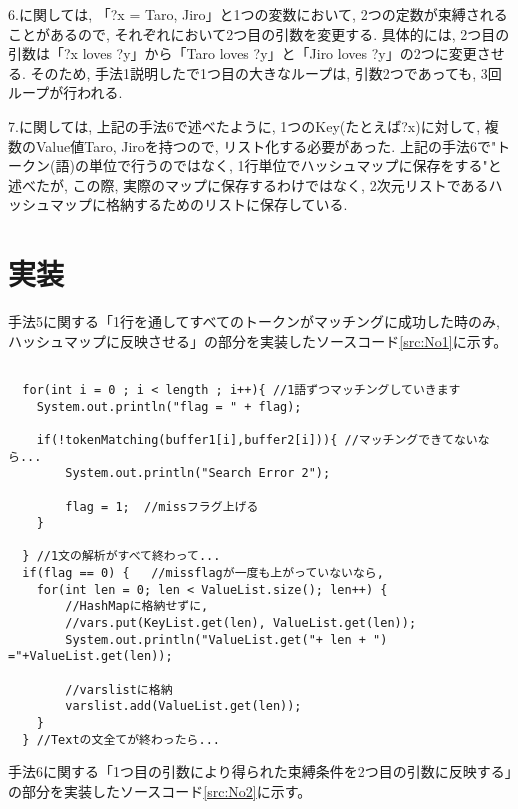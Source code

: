 \documentclass[uplatex,12pt]{jsarticle}
\begin{document}
6.に関しては, 「?x = Taro, Jiro」と1つの変数において, 2つの定数が束縛されることがあるので, それぞれにおいて2つ目の引数を変更する. 具体的には, 2つ目の引数は「?x loves ?y」から「Taro loves ?y」と「Jiro loves ?y」の2つに変更させる. そのため, 手法1説明したで1つ目の大きなループは, 引数2つであっても, 3回ループが行われる.

7.に関しては, 上記の手法6で述べたように, 1つのKey(たとえば?x)に対して, 複数のValue値{Taro, Jiro}を持つので, リスト化する必要があった. 上記の手法6で"トークン(語)の単位で行うのではなく, 1行単位でハッシュマップに保存をする"と述べたが, この際, 実際のマップに保存するわけではなく, 2次元リストであるハッシュマップに格納するためのリストに保存している.

\section{実装}

手法5に関する「1行を通してすべてのトークンがマッチングに成功した時のみ, ハッシュマップに反映させる」の部分を実装したソースコード\ref{src:No1}に示す。
\begin{lstlisting}[caption=1文すべて終わったら格納する,label=src:No1]

  for(int i = 0 ; i < length ; i++){ //1語ずつマッチングしていきます
	System.out.println("flag = " + flag);

	if(!tokenMatching(buffer1[i],buffer2[i])){ //マッチングできてないなら...
		System.out.println("Search Error 2");

		flag = 1;  //missフラグ上げる
	}

  } //1文の解析がすべて終わって...
  if(flag == 0) {	//missflagが一度も上がっていないなら,
	for(int len = 0; len < ValueList.size(); len++) {
	    //HashMapに格納せずに,
	    //vars.put(KeyList.get(len), ValueList.get(len));
	    System.out.println("ValueList.get("+ len + ") ="+ValueList.get(len));

	    //varslistに格納
	    varslist.add(ValueList.get(len));
	}
  } //Textの文全てが終わったら...
\end{lstlisting}

手法6に関する「1つ目の引数により得られた束縛条件を2つ目の引数に反映する」の部分を実装したソースコード\ref{src:No2}に示す。
\end{document}

